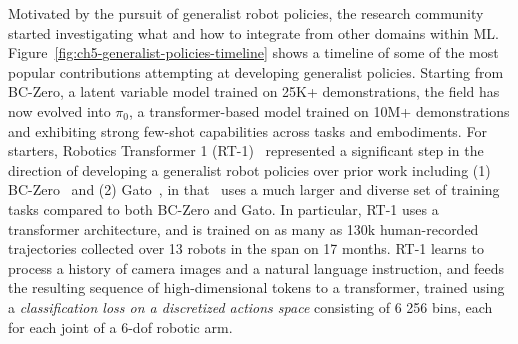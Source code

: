 Motivated by the pursuit of generalist robot policies, the research community started investigating what and how to integrate from other domains within ML.
Figure~\ref{fig:ch5-generalist-policies-timeline} shows a timeline of some of the most popular contributions attempting at developing generalist policies.
Starting from BC-Zero, a latent variable model trained on 25K+ demonstrations, the field has now evolved into \( \pi_0 \), a transformer-based model trained on 10M+ demonstrations and exhibiting strong few-shot capabilities across tasks and embodiments.
For starters, Robotics Transformer 1 (RT-1)~\citep{brohanRT1RoboticsTransformer2023} represented a significant step in the direction of developing a generalist robot policies over prior work including (1) BC-Zero~\citep{jangBCZZeroShotTask2022} and (2) Gato~\citep{reedGeneralistAgent2022}, in that~\citet{brohanRT1RoboticsTransformer2023} uses a much larger and diverse set of training tasks compared to both BC-Zero and Gato.
In particular, RT-1 uses a transformer architecture, and is trained on as many as 130k human-recorded trajectories collected over 13 robots in the span on 17 months.
RT-1 learns to process a history of camera images and a natural language instruction, and feeds the resulting sequence of high-dimensional tokens to a transformer, trained using a \emph{classification loss on a discretized actions space} consisting of 6 256 bins, each for each joint of a 6-dof robotic arm.

